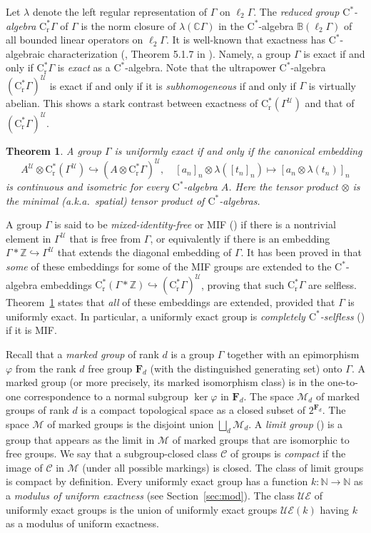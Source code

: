 \documentclass[12pt,nosumlimits,nonamelimits]{amsart}
\newtheorem{thmA}{Theorem}
\theoremstyle{remark}
\theoremstyle{definition}
\newcommand{\IB}{\mathbb{B}}
\newcommand{\IC}{\mathbb{C}}
\newcommand{\IN}{\mathbb{N}}
\newcommand{\IZ}{\mathbb{Z}}
\newcommand{\bF}{\mathbf{F}}
\newcommand{\rC}{\mathrm{C}}
\newcommand{\rr}{\mathrm{r}}
\newcommand{\cC}{\mathcal{C}}
\newcommand{\cM}{\mathcal{M}}
\newcommand{\cU}{\mathcal{U}}
\newcommand{\vp}{\varphi}
\newcommand{\Ga}{\Gamma}
\newcommand{\UE}{\mathcal{UE}}
\newcommand{\cst}{$\rC^*$-alge\-bra}
\begin{document}
Let $\lambda$ denote the left regular representation 
of $\Ga$ on $\ell_2\Ga$. 
The \emph{reduced group \cst{}} 
$\rC^*_\rr\Ga$ of $\Ga$ is the norm closure of 
$\lambda(\IC\Ga)$ in the \cst{} $\IB(\ell_2\Ga)$ 
of all bounded linear operators on $\ell_2\Ga$. 
It is well-known that exactness has $\mathrm{C}^*$-alge\-braic 
characterization (\cite{kw}, Theorem 5.1.7 in \cite{bo}). 
Namely, a group $\Ga$ is exact if and only if 
$\rC^*_\rr\Ga$ is \emph{exact} as a \cst{}. 
Note that the ultrapower \cst{} 
$(\rC^*_\rr\Ga)^\cU$ is exact if and only if 
it is \emph{subhomogeneous} if and only if 
$\Ga$ is virtually abelian. 
This shows a stark contrast between 
exactness of $\rC^*_\rr(\Ga^\cU)$ and that of $(\rC^*_\rr\Ga)^\cU$.

\begin{thmA}\label{thmA:unifamen}
A group $\Ga$ is uniformly exact if and only if 
the canonical embedding 
\[
A^\cU \otimes \rC^*_\rr(\Ga^\cU)
 \hookrightarrow (A \otimes \rC^*_\rr\Ga)^\cU,\quad 
 [a_n]_n\otimes\lambda([t_n]_n)\mapsto [a_n\otimes\lambda(t_n)]_n
\]
is continuous and isometric for every \cst{} $A$. 
Here the tensor product $\otimes$ is 
the minimal (a.k.a.\ spatial) tensor product of \cst{}s. 
\end{thmA}

A group $\Ga$ is said to be 
\emph{mixed-identity-free} or MIF (\cite{ho}) 
if there is a nontrivial element in $\Ga^\cU$ 
that is free from $\Ga$, or equivalently 
if there is an embedding 
$\Ga\ast\IZ \hookrightarrow \Ga^\cU$ 
that extends the diagonal embedding of $\Ga$. 
It has been proved in \cite{agkp, selfless, robert} 
that \emph{some} of these 
embeddings for some of the MIF groups 
are extended to the 
\cst{} embeddings 
$\rC^*_\rr(\Ga\ast\IZ) \hookrightarrow (\rC^*_\rr\Ga)^\cU$, 
proving that such $\rC^*_\rr\Ga$ are selfless. 
Theorem~\ref{thmA:unifamen} states that 
\emph{all} of these embeddings are extended, 
provided that $\Ga$ is uniformly exact. 
In particular, a uniformly exact group is 
\emph{completely $\mathrm{C}^*$-self\-less} 
(\cite{agkp, selfless, robert})
if it is MIF.

Recall that a \emph{marked group} of rank $d$ 
is a group $\Ga$ together with 
an epimorphism $\vp$ 
from the rank $d$ free group $\bF_d$ 
(with the distinguished generating set) onto $\Ga$. 
A marked group (or more precisely, its 
marked isomorphism class) 
is in the one-to-one correspondence to 
a normal subgroup $\ker\vp$ in $\bF_d$. 
The space $\cM_d$ of marked groups of rank $d$ 
is a compact topological space as a closed subset of $2^{\bF_d}$. 
The space $\cM$ of marked groups is the disjoint 
union $\bigsqcup_d\cM_d$. 
A \emph{limit group} (\cite{km,sela}) 
is a group that appears as the limit in $\cM$ 
of marked groups that are isomorphic to free groups. 
We say that a subgroup-closed class $\cC$ of groups 
is \emph{compact} if the image of $\cC$ 
in $\cM$ (under all possible markings) is closed. 
The class of limit groups is compact by definition. 
Every uniformly exact group has a function $k\colon\IN\to\IN$ as 
a \emph{modulus of uniform exactness} (see Section~\ref{sec:mod}). 
The class $\UE$ of uniformly exact groups 
is the union of uniformly exact groups $\UE(k)$ having 
$k$ as a modulus of uniform exactness.
\end{document}
